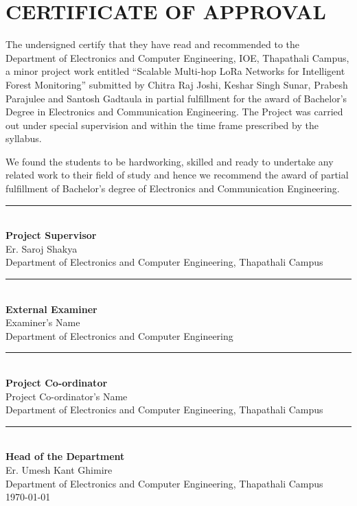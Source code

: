 
\chapter*{\centering \textbf{CERTIFICATE OF APPROVAL}}

The undersigned certify that they have read and recommended to the Department
of Electronics and Computer Engineering, IOE, Thapathali Campus, a minor
project work entitled ``Scalable Multi-hop LoRa Networks for Intelligent Forest
Monitoring'' submitted by Chitra Raj Joshi, Keshar Singh Sunar, Prabesh
Parajulee and Santosh Gadtaula in partial fulfillment for the award of
Bachelor's Degree in Electronics and Communication Engineering. The Project
was carried out under special supervision and within the time frame prescribed
by the syllabus.

We found the students to be hardworking, skilled and ready to undertake any
related work to their field of study and hence we recommend the award of
partial fulfillment of Bachelor's degree of Electronics and Communication
Engineering.

\noindent\rule{6cm}{0.4pt} \\
\textbf{Project Supervisor}\\
Er. Saroj Shakya\\
Department of Electronics and Computer Engineering, Thapathali Campus\\
\noindent\rule{6cm}{0.4pt} \\
\textbf{External Examiner}\\
Examiner's Name\\
Department of Electronics and Computer Engineering\\
\noindent\rule{6cm}{0.4pt} \\
\textbf{Project Co-ordinator}\\
Project Co-ordinator's Name\\
Department of Electronics and Computer Engineering, Thapathali Campus\\
\noindent\rule{6cm}{0.4pt} \\
\textbf{Head of the Department}\\
Er. Umesh Kant Ghimire\\
Department of Electronics and Computer Engineering, Thapathali Campus\\
\monthyeardate\today

\clearpage
